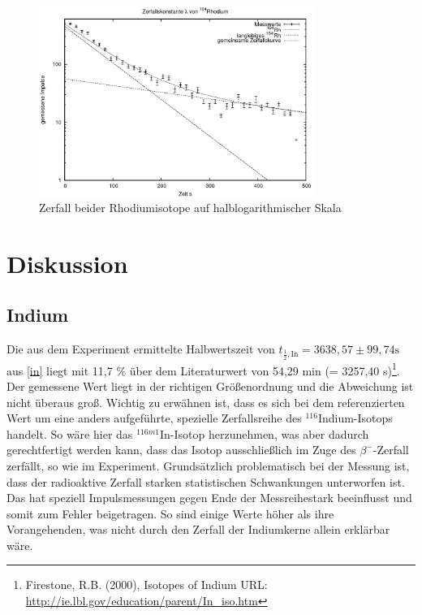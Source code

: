 \begin{figure}[h]
	\includegraphics[width=0.8\textwidth]{pics/rhodium.png}
	\caption{Zerfall beider Rhodiumisotope auf halblogarithmischer Skala}
\end{figure}


\section{Diskussion}
\subsection{Indium}
Die aus dem Experiment ermittelte Halbwertszeit von $t_{\frac12,\text{In}} = 3638,57 \pm 99,74 \text{s}$ aus \eqref{in} liegt mit 11,7 \% über dem
Literaturwert von 54,29 min (= 3257,40 s)\footnote[1]{Firestone, R.B. (2000), Isotopes of Indium URL: \href{http://ie.lbl.gov/education/parent/In\_iso.htm}{http://ie.lbl.gov/education/parent/In\_iso.htm}}.
Der gemessene Wert liegt in der richtigen Größenordnung und die Abweichung ist nicht überaus groß. Wichtig zu erwähnen ist, dass es
sich bei dem referenzierten Wert um eine anders aufgeführte, spezielle Zerfallsreihe des $^{116}$Indium-Isotops handelt. So wäre hier
das $^{116m1}$In-Isotop herzunehmen, was aber dadurch gerechtfertigt werden kann, dass das Isotop ausschließlich im Zuge des $\beta^-$-Zerfall
zerfällt, so wie im Experiment. Grundsätzlich problematisch bei der Messung ist, dass der radioaktive Zerfall starken statistischen Schwankungen unterworfen ist.
Das hat speziell Impulsmessungen gegen Ende der Messreihestark beeinflusst und somit zum Fehler beigetragen. So sind einige Werte höher 
als ihre Vorangehenden, was nicht durch den Zerfall der Indiumkerne allein erklärbar wäre.

